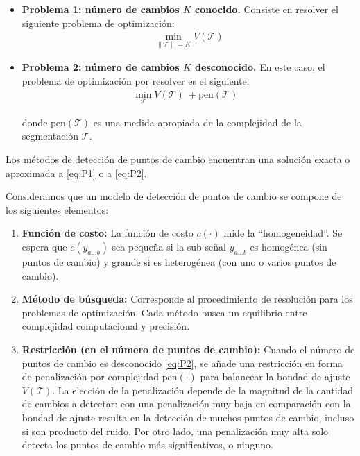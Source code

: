 \documentclass{article}[14pts]
\begin{document}
      \begin{itemize}

        \item \textbf{Problema 1: número de cambios $K$ conocido.} Consiste en resolver el siguiente problema de optimización: 
        \begin{align*}
          \min_{\|\mathcal{T}\|= K} V(\mathcal{T}) \tag{P1} \label{eq:P1}
        \end{align*}
      
        \item \textbf{Problema 2: número de cambios $K$ desconocido.} En este caso, el problema de optimización por resolver es el siguiente:
          \begin{align*}
            \min_{\mathcal{T}} V(\mathcal{T}) \ + \text{pen}(\mathcal{T}) \text{ } \tag{P2} \label{eq:P2}
          \end{align*}
        
        donde $\text{pen}(\mathcal{T})$ es una medida apropiada de la complejidad de la segmentación $\mathcal{T}$.

      \end{itemize}
    
    Los métodos de detección de puntos de cambio encuentran una solución exacta o aproximada a \eqref{eq:P1} o a \eqref{eq:P2}. 

    Consideramos que un modelo de detección de puntos de cambio se compone de los siguientes elementos:

      \begin{enumerate}
        \item \textbf{Función de costo:} La función de costo $c(\cdot)$ mide la ``homogeneidad''. Se espera que $c(y_{a\dots b})$ sea pequeña si la sub-señal $y_{a\dots b}$ es homogénea (sin puntos de cambio) y grande si es heterogénea (con uno o varios puntos de cambio).
        
        \item \textbf{Método de búsqueda:} Corresponde al procedimiento de resolución para los problemas de optimización. Cada método busca un equilibrio entre complejidad computacional y precisión.
        
        \item \textbf{Restricción (en el número de puntos de cambio):} Cuando el número de puntos de cambio es desconocido \eqref{eq:P2}, se añade una restricción en forma de penalización por complejidad $\text{pen}(\cdot)$ para balancear la bondad de ajuste $V(\mathcal{T})$. La elección de la penalización depende de la magnitud de la cantidad de cambios a detectar: con una penalización muy baja en comparación con la bondad de ajuste resulta en la detección de muchos puntos de cambio, incluso si son producto del ruido. Por otro lado, una penalización muy alta solo detecta los puntos de cambio más significativos, o ninguno. 
      \end{enumerate}
      
\end{document}
